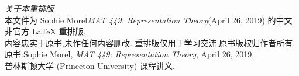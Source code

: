 \thispagestyle{empty}
\begin{center}
    \small
    \noindent\emph{关于本重排版}\\[0.5em]
    本文件为 Sophie Morel\emph{MAT 449: Representation Theory}(April 26, 2019)
    的中文非官方 \LaTeX{} 重排版,\\
    内容忠实于原书,未作任何内容删改.
    重排版仅用于学习交流,原书版权归作者所有.\\
    \vspace{0.5cm}
    原书:Sophie Morel, \textit{MAT 449: Representation Theory}, April 26, 2019,\\
    普林斯顿大学 (Princeton University) 课程讲义.
\end{center}
